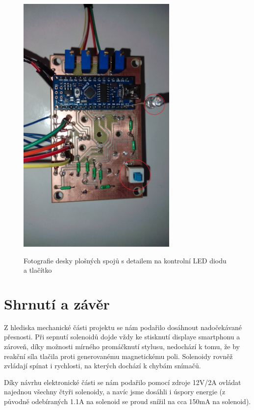 \documentclass[12pt,oneside]{book} %
\begin{document}
\begin{figure}[ht]\small\centering
\includegraphics[width=0.70\textwidth]{./img/Navod.jpg}\\[1cm] 
\caption{Fotografie desky plošných spojů s detailem na kontrolní LED diodu a tlačítko}
\label{Navod}
\end{figure}  

\part{Shrnutí a závěr}\label{shrnuti}

\qquad Z hlediska mechanické části projektu se nám podařilo dosáhnout nadočekávané přesnosti. Při sepnutí solenoidů dojde vždy ke stisknutí displaye smartphonu a zároveň, díky možnosti mírného promáčknutí stylusu, nedochází k tomu, že by reakční síla tlačila proti generovanému magnetickému poli. Solenoidy rovněž zvládají spínat i rychlosti, na kterých dochází k chybám snímačů.

\qquad Díky návrhu elektronické části se nám podařilo pomocí zdroje 12V/2A ovládat najednou všechny čtyři solenoidy, a navíc jsme dosáhli i úspory energie (z původně odebíraných 1.1A na solenoid se proud snížil na cca 150mA na solenoid).
\end{document}
